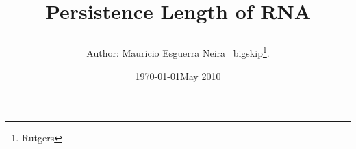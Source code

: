 \documentclass[letterpaper,11pt,pdftex]{article}
\title{Persistence Length of RNA \\
       \bigskip \bigskip \bigskip \bigskip \bigskip \bigskip  \bigskip \bigskip \bigskip
      
 \bigskip \bigskip \bigskip\bigskip\bigskip}
\date{\bigskip \bigskip\bigskip\bigskip\bigskip\bigskip\bigskip\bigskip
 \bigskip\bigskip\bigskip\bigskip\bigskip\bigskip\bigskip \today}
\author{Author: Mauricio Esguerra Neira \bigskip\bigskip\bigskip\bigskip\bigskip\
bigskip\bigskip\bigskip \thanks{Rutgers}.\\\bigskip\bigskip\bigskip\bigskip\bigskip\bigskip}
\date{May 2010}
\begin{document}
\maketitle
%
\pagebreak
\tableofcontents


\end{document}

